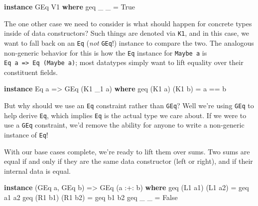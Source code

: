 \documentclass[
  11pt,
]{book}
\newenvironment{Shaded}{}{}
\newcommand{\DataTypeTok}[1]{\textcolor[rgb]{0.56,0.13,0.00}{#1}}
\newcommand{\KeywordTok}[1]{\textcolor[rgb]{0.00,0.44,0.13}{\textbf{#1}}}
\newcommand{\NormalTok}[1]{#1}
\newcommand{\OperatorTok}[1]{\textcolor[rgb]{0.40,0.40,0.40}{#1}}
\newcommand{\OtherTok}[1]{\textcolor[rgb]{0.00,0.44,0.13}{#1}}
\theoremstyle{nonumberplain}
\begin{document}
\begin{Shaded}
\begin{Highlighting}[]
\KeywordTok{instance} \DataTypeTok{GEq} \DataTypeTok{V1} \KeywordTok{where}
\NormalTok{  geq \_ \_ }\OtherTok{=} \DataTypeTok{True}
\end{Highlighting}
\end{Shaded}

The one other case we need to consider is what should happen for
concrete types inside of data constructors? Such things are denoted via
\texttt{K1}, and in this case, we want to fall back on an \texttt{Eq}
(\emph{not} \texttt{GEq}!) instance to compare the two. The analogous
non-generic behavior for this is how the \texttt{Eq} instance for
\texttt{Maybe\ a} is \texttt{Eq\ a\ =\textgreater{}\ Eq\ (Maybe\ a)};
most datatypes simply want to lift equality over their constituent
fields.

\begin{Shaded}
\begin{Highlighting}[]
\KeywordTok{instance} \DataTypeTok{Eq}\NormalTok{ a }\OtherTok{=\textgreater{}} \DataTypeTok{GEq}\NormalTok{ (}\DataTypeTok{K1}\NormalTok{ \_1 a) }\KeywordTok{where}
\NormalTok{  geq (}\DataTypeTok{K1}\NormalTok{ a) (}\DataTypeTok{K1}\NormalTok{ b) }\OtherTok{=}\NormalTok{ a }\OperatorTok{==}\NormalTok{ b}
\end{Highlighting}
\end{Shaded}

But why should we use an \texttt{Eq} constraint rather than
\texttt{GEq}? Well we're using \texttt{GEq} to help derive \texttt{Eq},
which implies \texttt{Eq} is the actual type we care about. If we were
to use a \texttt{GEq} constraint, we'd remove the ability for anyone to
write a non-generic instance of \texttt{Eq}!

With our base cases complete, we're ready to lift them over sums. Two
sums are equal if and only if they are the same data constructor (left
or right), and if their internal data is equal.

\begin{Shaded}
\begin{Highlighting}[]
\KeywordTok{instance}\NormalTok{ (}\DataTypeTok{GEq}\NormalTok{ a, }\DataTypeTok{GEq}\NormalTok{ b) }\OtherTok{=\textgreater{}} \DataTypeTok{GEq}\NormalTok{ (a }\OperatorTok{:+:}\NormalTok{ b) }\KeywordTok{where}
\NormalTok{  geq (}\DataTypeTok{L1}\NormalTok{ a1) (}\DataTypeTok{L1}\NormalTok{ a2) }\OtherTok{=}\NormalTok{ geq a1 a2}
\NormalTok{  geq (}\DataTypeTok{R1}\NormalTok{ b1) (}\DataTypeTok{R1}\NormalTok{ b2) }\OtherTok{=}\NormalTok{ geq b1 b2}
\NormalTok{  geq \_ \_             }\OtherTok{=} \DataTypeTok{False}
\end{Highlighting}
\end{Shaded}
\end{document}
